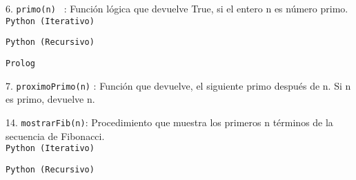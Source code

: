 \documentclass[10pt,letterpaper]{article}
\begin{document}
6. \texttt{primo(n) } : Función lógica que devuelve True, si el entero n es número primo. \\

\texttt{Python (Iterativo)}


\texttt{Python (Recursivo)}


\texttt{Prolog}


7. \texttt{proximoPrimo(n)} : Función que devuelve, el siguiente primo después de n. Si n es primo, devuelve n. \\

\pagebreak

14. \texttt{mostrarFib(n)}: Procedimiento que muestra los primeros n términos de la secuencia de Fibonacci. \\
\texttt{Python (Iterativo)}


\texttt{Python (Recursivo)}

\end{document}
